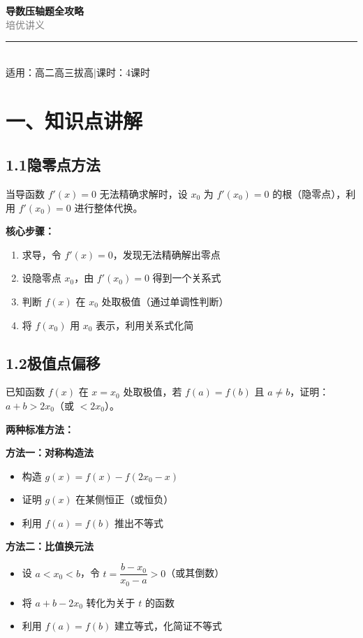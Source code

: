 \documentclass[12pt, a4paper]{ctexart}
\begin{document}
\begin{center}
{\Huge\bfseries\textcolor{mainblue}{导数压轴题全攻略}}\\[12pt]
{\Large\textcolor{gray}{培优讲义}}\\[8pt]
\rule{0.6\textwidth}{1pt}\\[8pt]
{\normalsize 适用：高二高三拔高\quad |\quad 课时：4课时}
\end{center}
\vspace{10pt}

\section*{\textcolor{mainblue}{一、知识点讲解}}

\subsection*{1.1\quad 隐零点方法}

\begin{knowledgebox}
当导函数 $f'(x)=0$ 无法精确求解时，设 $x_0$ 为 $f'(x_0)=0$ 的根（隐零点），利用 $f'(x_0)=0$ 进行整体代换。

\textbf{核心步骤：}
\begin{enumerate}[leftmargin=2em]
  \item 求导，令 $f'(x)=0$，发现无法精确解出零点
  \item 设隐零点 $x_0$，由 $f'(x_0)=0$ 得到一个关系式
  \item 判断 $f(x)$ 在 $x_0$ 处取极值（通过单调性判断）
  \item 将 $f(x_0)$ 用 $x_0$ 表示，利用关系式化简
\end{enumerate}
\end{knowledgebox}

\subsection*{1.2\quad 极值点偏移}

\begin{knowledgebox}[极值点偏移问题]
已知函数 $f(x)$ 在 $x=x_0$ 处取极值，若 $f(a)=f(b)$ 且 $a\neq b$，证明：$a+b>2x_0$（或 $<2x_0$）。

\textbf{两种标准方法：}

\textbf{方法一：对称构造法}
\begin{itemize}[leftmargin=2em]
  \item 构造 $g(x)=f(x)-f(2x_0-x)$
  \item 证明 $g(x)$ 在某侧恒正（或恒负）
  \item 利用 $f(a)=f(b)$ 推出不等式
\end{itemize}

\textbf{方法二：比值换元法}
\begin{itemize}[leftmargin=2em]
  \item 设 $a<x_0<b$，令 $t=\dfrac{b-x_0}{x_0-a}>0$（或其倒数）
  \item 将 $a+b-2x_0$ 转化为关于 $t$ 的函数
  \item 利用 $f(a)=f(b)$ 建立等式，化简证不等式
\end{itemize}
\end{knowledgebox}
\end{document}
